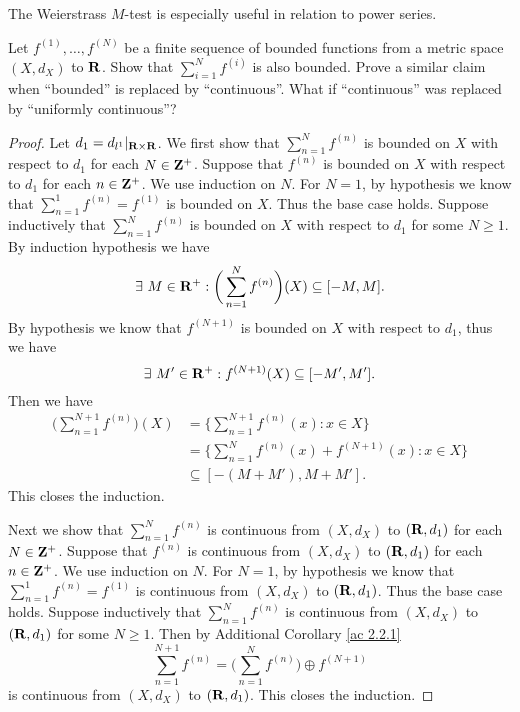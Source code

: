 \begin{note}
    The Weierstrass \(M\)-test is especially useful in relation to power series.
\end{note}

\exercisesection

\begin{exercise}\label{ex 3.5.1}
    Let \(f^{(1)}, \dots, f^{(N)}\) be a finite sequence of bounded functions from a metric space \((X, d_X)\) to \(\mathbf{R}\).
    Show that \(\sum_{i = 1}^N f^{(i)}\) is also bounded.
    Prove a similar claim when ``bounded'' is replaced by ``continuous''.
    What if ``continuous'' was replaced by ``uniformly continuous''?
\end{exercise}

\begin{proof}
    Let \(d_1 = d_{l^1}|_{\mathbf{R} \times \mathbf{R}}\).
    We first show that \(\sum_{n = 1}^N f^{(n)}\) is bounded on \(X\) with respect to \(d_1\) for each \(N \in \mathbf{Z}^+\).
    Suppose that \(f^{(n)}\) is bounded on \(X\) with respect to \(d_1\) for each \(n \in \mathbf{Z}^+\).
    We use induction on \(N\).
    For \(N = 1\), by hypothesis we know that \(\sum_{n = 1}^1 f^{(n)} = f^{(1)}\) is bounded on \(X\).
    Thus the base case holds.
    Suppose inductively that \(\sum_{n = 1}^N f^{(n)}\) is bounded on \(X\) with respect to \(d_1\) for some \(N \geq 1\).
    By induction hypothesis we have
    \[
        \exists\ M \in \mathbf{R}^+ : \bigg(\sum_{n = 1}^N f^{(n)}\bigg)(X) \subseteq [-M, M].
    \]
    By hypothesis we know that \(f^{(N + 1)}\) is bounded on \(X\) with respect to \(d_1\), thus we have
    \[
        \exists\ M' \in \mathbf{R}^+ : f^{(N + 1)}(X) \subseteq [-M', M'].
    \]
    Then we have
    \begin{align*}
        \bigg(\sum_{n = 1}^{N + 1} f^{(n)}\bigg)(X) & = \bigg\{\sum_{n = 1}^{N + 1} f^{(n)}(x) : x \in X\bigg\}            \\
                                                    & = \bigg\{\sum_{n = 1}^N f^{(n)}(x) + f^{(N + 1)}(x) : x \in X\bigg\} \\
                                                    & \subseteq [-(M + M'), M + M'].
    \end{align*}
    This closes the induction.

    Next we show that \(\sum_{n = 1}^N f^{(n)}\) is continuous from \((X, d_X)\) to \((\mathbf{R}, d_1)\) for each \(N \in \mathbf{Z}^+\).
    Suppose that \(f^{(n)}\) is continuous from \((X, d_X)\) to \((\mathbf{R}, d_1)\) for each \(n \in \mathbf{Z}^+\).
    We use induction on \(N\).
    For \(N = 1\), by hypothesis we know that \(\sum_{n = 1}^1 f^{(n)} = f^{(1)}\) is continuous from \((X, d_X)\) to \((\mathbf{R}, d_1)\).
    Thus the base case holds.
    Suppose inductively that \(\sum_{n = 1}^N f^{(n)}\) is continuous from \((X, d_X)\) to \((\mathbf{R}, d_1)\) for some \(N \geq 1\).
    Then by Additional Corollary \ref{ac 2.2.1}
    \[
        \sum_{n = 1}^{N + 1} f^{(n)} = \bigg(\sum_{n = 1}^N f^{(n)}\bigg) \oplus f^{(N + 1)}
    \]
    is continuous from \((X, d_X)\) to \((\mathbf{R}, d_1)\).
    This closes the induction.


\end{proof}
